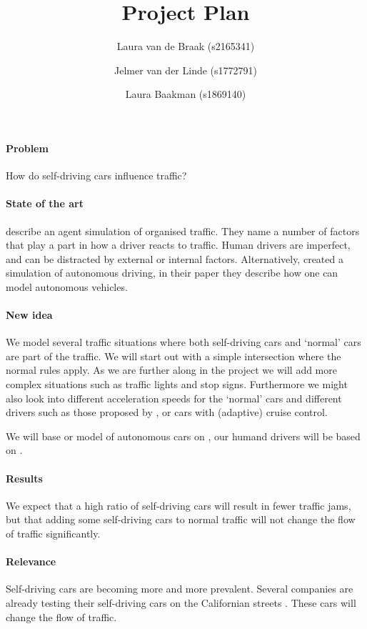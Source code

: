 \documentclass[a4paper]{article}
\title{Project Plan\\ \sc{traffic simulation self-driving cars}}
\author{%
	Laura van de Braak (s2165341) \and 
	Jelmer van der Linde (s1772791) \and 
	Laura Baakman (s1869140)
}
\begin{document}
\maketitle

\paragraph{Problem} How do self-driving cars influence traffic?

\paragraph{State of the art} \citeauthor{paruchuri2002multi} describe an agent simulation of organised traffic. They name a number of factors that play a part in how a driver reacts to traffic. Human drivers are imperfect, and can be distracted by external or internal factors. Alternatively, \citeauthor{jiang2010microscopic} created a simulation of autonomous driving, in their paper they describe how one can model autonomous vehicles.

\paragraph{New idea} We model several traffic situations where both self-driving cars and `normal' cars are part of the traffic. We will start out with a simple intersection where the normal rules apply. As we are further along in the project we will add more complex situations such as traffic lights and stop signs. Furthermore we might also look into different acceleration speeds for the `normal' cars and different drivers such as those proposed by \citeauthor{paruchuri2002multi}, or cars with (adaptive) cruise control.

We will base or model of autonomous cars on \citeauthor{jiang2010microscopic}, our humand drivers will be based on \citeauthor{paruchuri2002multi}.

\paragraph{Results} We expect that a high ratio of self-driving cars will result in fewer traffic jams, but that adding some self-driving cars to normal traffic will not change the flow of traffic significantly.  

\paragraph{Relevance} Self-driving cars are becoming more and more prevalent. Several companies are already testing their self-driving cars on the Californian streets \cite{honda}. These cars will change the flow of traffic. 

\printbibliography
\end{document}
